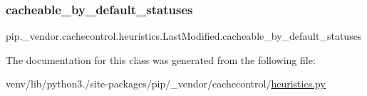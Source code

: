 \subsubsection{\texorpdfstring{cacheable\+\_\+by\+\_\+default\+\_\+statuses}{cacheable\_by\_default\_statuses}}
{\footnotesize\ttfamily pip.\+\_\+vendor.\+cachecontrol.\+heuristics.\+Last\+Modified.\+cacheable\+\_\+by\+\_\+default\+\_\+statuses\hspace{0.3cm}{\ttfamily [static]}}



The documentation for this class was generated from the following file\+:\begin{DoxyCompactItemize}
\item 
venv/lib/python3./site-\/packages/pip/\+\_\+vendor/cachecontrol/\hyperlink{heuristics_8py}{heuristics.\+py}\end{DoxyCompactItemize}
